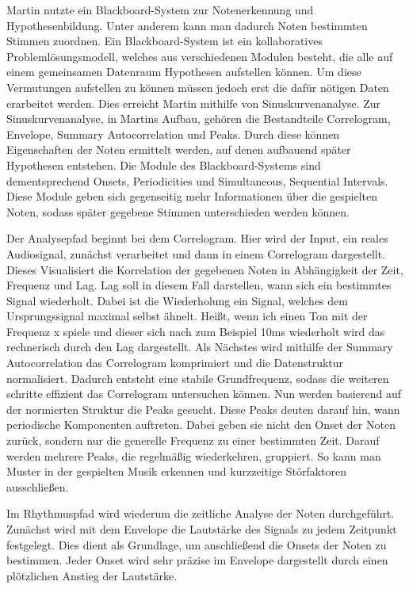 Martin nutzte ein Blackboard-System zur Notenerkennung und Hypothesenbildung.
Unter anderem kann man dadurch Noten bestimmten Stimmen zuordnen.
Ein Blackboard-System ist ein kollaboratives Problemlösungsmodell, welches aus verschiedenen Modulen besteht,
die alle auf einem gemeinsamen Datenraum Hypothesen aufstellen können.
Um diese Vermutungen aufstellen zu können müssen jedoch erst die dafür nötigen Daten erarbeitet werden.
Dies erreicht Martin mithilfe von Sinuskurvenanalyse.
Zur Sinuskurvenanalyse, in Martins Aufbau, gehören die Bestandteile
Correlogram, Envelope, Summary Autocorrelation und Peaks.
Durch diese können Eigenschaften der Noten ermittelt werden, auf denen aufbauend später Hypothesen entstehen.
Die Module des Blackboard-Systems sind dementsprechend
Onsets, Periodicities und Simultaneous, Sequential Intervals.
Diese Module geben sich gegenseitig mehr Informationen über die gespielten Noten,
sodass später gegebene Stimmen unterschieden werden können.

Der Analysepfad beginnt bei dem Correlogram.
Hier wird der Input, ein reales Audiosignal,
zunächst verarbeitet und dann in einem Correlogram dargestellt.
Dieses Visualisiert die Korrelation der gegebenen Noten in Abhängigkeit der Zeit, Frequenz und Lag.
Lag soll in diesem Fall darstellen, wann sich ein bestimmtes Signal wiederholt.
Dabei ist die Wiederholung ein Signal, welches dem Ursprungssignal maximal selbst ähnelt.
Heißt, wenn ich einen Ton mit der Frequenz x spiele
und dieser sich nach zum Beispiel 10ms wiederholt wird das rechnerisch durch den Lag dargestellt.
Als Nächstes wird mithilfe der Summary Autocorrelation das Correlogram komprimiert
und die Datenstruktur normalisiert.
Dadurch entsteht eine stabile Grundfrequenz,
sodass die weiteren schritte effizient das Correlogram untersuchen können.
Nun werden basierend auf der normierten Struktur die Peaks gesucht.
Diese Peaks deuten darauf hin, wann periodische Komponenten auftreten.
Dabei geben sie nicht den Onset der Noten zurück, sondern nur die generelle Frequenz zu einer bestimmten Zeit.
Darauf werden mehrere Peaks, die regelmäßig wiederkehren, gruppiert.
So kann man Muster in der gespielten Musik erkennen und kurzzeitige Störfaktoren ausschließen.

Im Rhythmuspfad wird wiederum die zeitliche Analyse der Noten durchgeführt.
Zunächst wird mit dem Envelope die Lautstärke des Signals zu jedem Zeitpunkt festgelegt.
Dies dient als Grundlage, um anschließend die Onsets der Noten zu bestimmen.
Jeder Onset wird sehr präzise im Envelope dargestellt durch einen plötzlichen Anstieg der Lautstärke.

